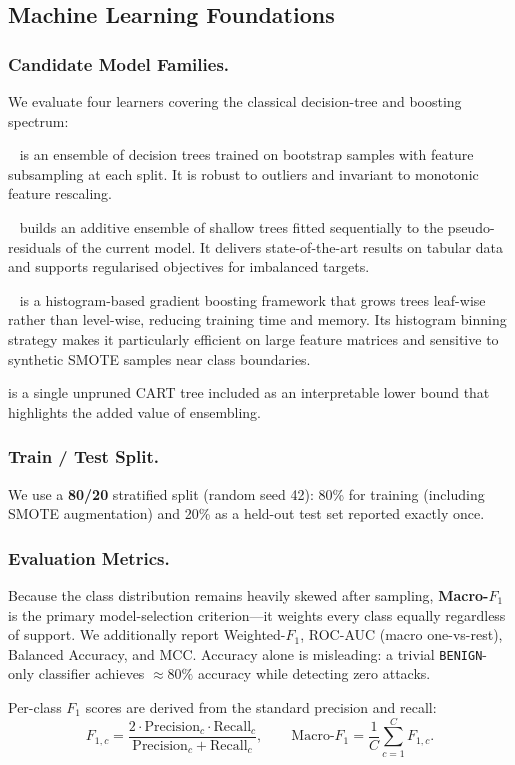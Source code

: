 \subsection{Machine Learning Foundations}
\label{sec:bg-ml}

\subsubsection*{Candidate Model Families.}
We evaluate four learners covering the classical decision-tree and boosting spectrum:
\begin{description}[leftmargin=1.2em,itemsep=2pt,topsep=2pt]
    \item[Random Forest (RF)]~\cite{ref_rf} is an ensemble of decision trees trained on bootstrap samples with feature subsampling at each split. It is robust to outliers and invariant to monotonic feature rescaling.
    \item[XGBoost]~\cite{ref_xgboost} builds an additive ensemble of shallow trees fitted sequentially to the pseudo-residuals of the current model. It delivers state-of-the-art results on tabular data and supports regularised objectives for imbalanced targets.
    \item[LightGBM]~\cite{ref_lightgbm} is a histogram-based gradient boosting framework that grows trees leaf-wise rather than level-wise, reducing training time and memory. Its histogram binning strategy makes it particularly efficient on large feature matrices and sensitive to synthetic SMOTE samples near class boundaries.
    \item[Decision Tree (DT)] is a single unpruned CART tree included as an interpretable lower bound that highlights the added value of ensembling.
\end{description}

\subsubsection*{Train / Test Split.}
We use a \textbf{80/20} stratified split (random seed 42): 80\% for training (including SMOTE augmentation) and 20\% as a held-out test set reported exactly once.

\subsubsection*{Evaluation Metrics.}
Because the class distribution remains heavily skewed after sampling, \textbf{Macro-$F_1$} is the primary model-selection criterion---it weights every class equally regardless of support. We additionally report Weighted-$F_1$, ROC-AUC (macro one-vs-rest), Balanced Accuracy, and MCC. Accuracy alone is misleading: a trivial \texttt{BENIGN}-only classifier achieves $\approx 80\%$ accuracy while detecting zero attacks.

Per-class $F_1$ scores are derived from the standard precision and recall:
\begin{equation}
    F_{1,c} = \frac{2 \cdot \text{Precision}_c \cdot \text{Recall}_c}{\text{Precision}_c + \text{Recall}_c}, \qquad \text{Macro-}F_1 = \frac{1}{C}\sum_{c=1}^{C} F_{1,c}.
\end{equation}
